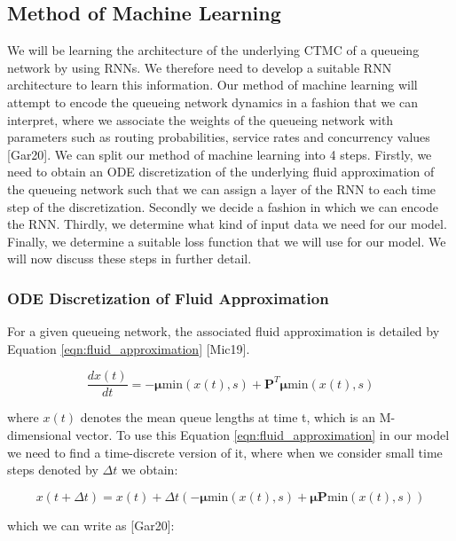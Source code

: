 \documentclass[a4paper,11pt,titlepage]{article}
\begin{document}
\subsection{Method of Machine Learning}

We will be learning the architecture of the underlying CTMC of a queueing network by using RNNs. We therefore need to develop a suitable RNN architecture to learn this information. Our method of machine learning will attempt to encode the queueing network dynamics in a fashion that we can interpret, where we associate the weights of the queueing network with parameters such as routing probabilities, service rates and concurrency values [Gar20]. We can split our method of machine learning into 4 steps. Firstly, we need to obtain an ODE discretization of the underlying fluid approximation of the queueing network such that we can assign a layer of the RNN to each time step of the discretization. Secondly we decide a fashion in which we can encode the RNN. Thirdly, we determine what kind of input data we need for our model. Finally, we determine a suitable loss function that we will use for our model. We will now discuss these steps in further detail.

\subsubsection{ODE Discretization of Fluid Approximation}

For a given queueing network, the associated fluid approximation is detailed by Equation \ref{eqn:fluid_approximation} [Mic19].

\begin{equation}
    \frac{d x(t)}{dt} = - \bm{\mu} \text{min} (x(t), s) + \mathbf{P}^T \bm{\mu} \text{min} (x(t),s)
    \label{eqn:fluid_approximation}
\end{equation}

where $x(t)$ denotes the mean queue lengths at time t, which is an M-dimensional vector. To use this Equation \ref{eqn:fluid_approximation} in our model we need to find a time-discrete version of it, where when we consider small time steps denoted by $\Delta t$ we obtain: 

\begin{equation}
    x(t + \Delta t) = x(t) + \Delta t (-\bm{\mu} \text{min} (x(t), s) + \bm{\mu} \mathbf{P} \text{min}(x(t),s))
    \label{time_discrete_fa}
\end{equation}

which we can write as [Gar20]: 
\end{document}
